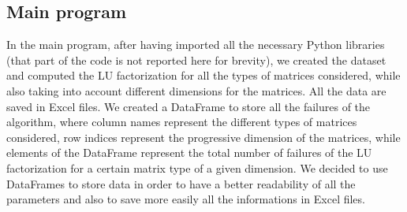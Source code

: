 \documentclass[a4paper,11pt]{report}
\begin{document}
\subsection*{Main program}{\label{subsect:Main_Program}}
In the main program, after having imported all the necessary Python libraries (that part of the code is not reported here for brevity), we created the dataset and computed the LU factorization for all the types of matrices considered, while also taking into account different dimensions for the matrices. All the data are saved in Excel files. We created a DataFrame to store all the failures of the algorithm, where column names represent the different types of matrices considered, row indices represent the progressive dimension of the matrices, while elements of the DataFrame represent the total number of failures of the LU factorization for a certain matrix type of a given dimension. We decided to use DataFrames to store data in order to have a better readability of all the parameters and also to save more easily all the informations in Excel files.
\end{document}
